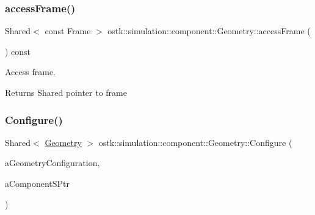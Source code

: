 \subsubsection{\texorpdfstring{access\+Frame()}{accessFrame()}}
{\footnotesize\ttfamily Shared$<$ const Frame $>$ ostk\+::simulation\+::component\+::\+Geometry\+::access\+Frame (\begin{DoxyParamCaption}{ }\end{DoxyParamCaption}) const}



Access frame. 

\begin{DoxyReturn}{Returns}
Shared pointer to frame 
\end{DoxyReturn}
\mbox{\label{classostk_1_1simulation_1_1component_1_1_geometry_acec7bbd02a66a0fba781b4ab259ab7a5}} 
\subsubsection{\texorpdfstring{Configure()}{Configure()}}
{\footnotesize\ttfamily Shared$<$ \hyperlink{classostk_1_1simulation_1_1component_1_1_geometry}{Geometry} $>$ ostk\+::simulation\+::component\+::\+Geometry\+::\+Configure (\begin{DoxyParamCaption}\item[{const \hyperlink{structostk_1_1simulation_1_1component_1_1_geometry_configuration}{Geometry\+Configuration} \&}]{a\+Geometry\+Configuration,  }\item[{const Shared$<$ const \hyperlink{classostk_1_1simulation_1_1_component}{Component} $>$ \&}]{a\+Component\+S\+Ptr }\end{DoxyParamCaption})\hspace{0.3cm}{\ttfamily [static]}}

\mbox{\label{classostk_1_1simulation_1_1component_1_1_geometry_af39e2376a527720e37e46dc57f3eb6a5}} 
